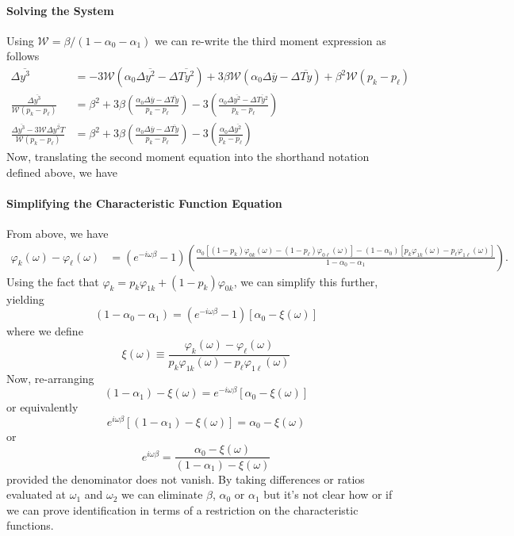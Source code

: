 \documentclass[12pt]{article}
\begin{document}
\paragraph{Solving the System}
Using $\mathcal{W} = \beta/(1 - \alpha_0 - \alpha_1)$ we can re-write the third moment expression as follows
\begin{align*}
  \Delta \overline{y^3} &= -3\mathcal{W}\left( \alpha_0 \Delta\overline{y^2} - \Delta\overline{Ty^2} \right) + 3\beta \mathcal{W}\left( \alpha_0 \Delta\overline{y} - \Delta\overline{Ty} \right) + \beta^2 \mathcal{W} (p_k - p_\ell)\\
  \frac{\Delta \overline{y^3}}{\mathcal{W} (p_k - p_\ell)} 
  &= \beta^2 + 3\beta \left(\frac{ \alpha_0 \Delta\overline{y} - \Delta\overline{Ty} }{p_k - p_\ell}\right) -3\left(\frac{ \alpha_0 \Delta\overline{y^2} - \Delta\overline{Ty^2} }{p_k - p_\ell}\right) \\
  \frac{\Delta \overline{y^3} - 3\mathcal{W}\Delta\overline{y^2T}}{\mathcal{W}(p_k - p_\ell)}
  &= \beta^2 + 3\beta \left(\frac{ \alpha_0 \Delta\overline{y} - \Delta\overline{Ty} }{p_k - p_\ell}\right) -3\left(\frac{ \alpha_0 \Delta\overline{y^2}  }{p_k - p_\ell}\right) 
\end{align*}
Now, translating the second moment equation into the shorthand notation defined above, we have


\paragraph{Simplifying the Characteristic Function Equation}
From above, we have
\begin{align*}
  \varphi_k(\omega) - \varphi_{\ell}(\omega) &= \left( e^{-i\omega\beta} - 1 \right)\left(\frac{\alpha_0\left[ (1 - p_k)\varphi_{0k}(\omega) - (1-p_\ell)\varphi_{0\ell}(\omega) \right]  - (1 - \alpha_0)\left[ p_k \varphi_{1k}(\omega) - p_\ell \varphi_{1\ell}(\omega) \right]}{1 - \alpha_0 - \alpha_1}\right).
\end{align*}
Using the fact that $\varphi_{k} = p_k \varphi_{1k} + (1 - p_k) \varphi_{0k}$, we can simplify this further, yielding
\[
(1 - \alpha_0 - \alpha_1) = \left( e^{-i\omega \beta} - 1 \right)\left[ \alpha_0 - \xi(\omega)\right] 
\]
where we define
\[
  \xi(\omega) \equiv \frac{\varphi_k(\omega) - \varphi_\ell(\omega)}{p_k \varphi_{1k}(\omega) - p_\ell\varphi_{1\ell}(\omega)}
\]
Now, re-arranging
\[
  (1 - \alpha_1) - \xi(\omega) = e^{-i\omega\beta}\left[ \alpha_0 - \xi(\omega) \right]  
\]
or equivalently
\[
  e^{i\omega\beta}\left[(1 - \alpha_1) - \xi(\omega)\right] =  \alpha_0 - \xi(\omega) 
\]
or
\[
  e^{i\omega \beta} = \frac{\alpha_0 - \xi(\omega)}{(1 - \alpha_1) - \xi(\omega)}
\]
provided the denominator does not vanish.
By taking differences or ratios evaluated at $\omega_1$ and $\omega_2$ we can eliminate $\beta$, $\alpha_0$ or $\alpha_1$ but it's not clear how or if we can prove identification in terms of a restriction on the characteristic functions.
\end{document}

